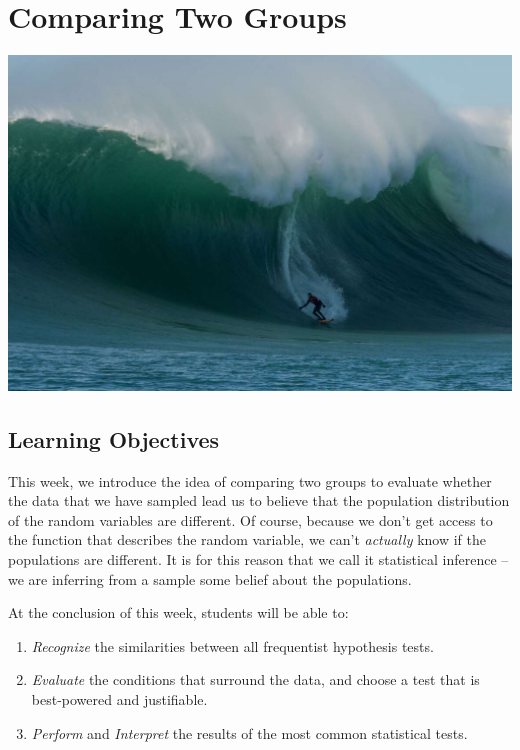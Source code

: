 \documentclass[
]{book}
\providecommand{\tightlist}{%
  \setlength{\itemsep}{0pt}\setlength{\parskip}{0pt}}
\theoremstyle{definition}
\theoremstyle{definition}
\theoremstyle{definition}
\theoremstyle{definition}
\theoremstyle{remark}
\begin{document}
\hypertarget{comparing-two-groups}{%
\chapter{Comparing Two Groups}\label{comparing-two-groups}}

\includegraphics{./images/goin_left.jpeg}

\hypertarget{learning-objectives-6}{%
\section{Learning Objectives}\label{learning-objectives-6}}

This week, we introduce the idea of comparing two groups to evaluate whether the data that we have sampled lead us to believe that the population distribution of the random variables are different. Of course, because we don't get access to the function that describes the random variable, we can't \emph{actually} know if the populations are different. It is for this reason that we call it statistical inference -- we are inferring from a sample some belief about the populations.

At the conclusion of this week, students will be able to:

\begin{enumerate}
\def\labelenumi{\arabic{enumi}.}
\tightlist
\item
  \emph{Recognize} the similarities between all frequentist hypothesis tests.
\item
  \emph{Evaluate} the conditions that surround the data, and choose a test that is best-powered and justifiable.
\item
  \emph{Perform} and \emph{Interpret} the results of the most common statistical tests.
\end{enumerate}
\end{document}
